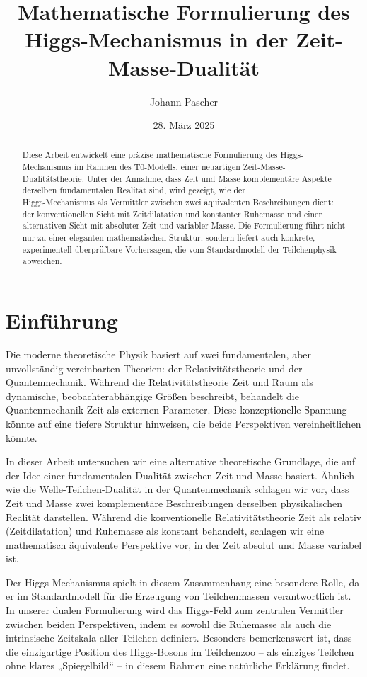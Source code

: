 \documentclass[a4paper,12pt]{article}
\title{Mathematische Formulierung des Higgs-Mechanismus in der Zeit-Masse-Dualität}
\author{Johann Pascher}
\date{28. März 2025}
\begin{document}
	
	\maketitle
	
	\begin{abstract}
		Diese Arbeit entwickelt eine präzise mathematische Formulierung des Higgs-Mechanismus im Rahmen des T0-Modells, einer neuartigen Zeit-Masse-Dualitätstheorie. Unter der Annahme, dass Zeit und Masse komplementäre Aspekte derselben fundamentalen Realität sind, wird gezeigt, wie der \\Higgs-Mechanismus als Vermittler zwischen zwei äquivalenten Beschreibungen dient: der konventionellen Sicht mit Zeitdilatation und konstanter Ruhemasse und einer alternativen Sicht mit absoluter Zeit und variabler Masse. Die Formulierung führt nicht nur zu einer eleganten mathematischen Struktur, sondern liefert auch konkrete, experimentell überprüfbare Vorhersagen, die vom Standardmodell der Teilchenphysik abweichen.
	\end{abstract}
	
	\tableofcontents
	\newpage
	
	\section{Einführung}
	Die moderne theoretische Physik basiert auf zwei fundamentalen, aber unvollständig vereinbarten Theorien: der Relativitätstheorie und der Quantenmechanik. Während die Relativitätstheorie Zeit und Raum als dynamische, beobachterabhängige Größen beschreibt, behandelt die Quantenmechanik Zeit als externen Parameter. Diese konzeptionelle Spannung könnte auf eine tiefere Struktur hinweisen, die beide Perspektiven vereinheitlichen könnte.
	
	In dieser Arbeit untersuchen wir eine alternative theoretische Grundlage, die auf der Idee einer fundamentalen Dualität zwischen Zeit und Masse basiert. Ähnlich wie die Welle-Teilchen-Dualität in der Quantenmechanik schlagen wir vor, dass Zeit und Masse zwei komplementäre Beschreibungen derselben physikalischen Realität darstellen. Während die konventionelle Relativitätstheorie Zeit als relativ (Zeitdilatation) und Ruhemasse als konstant behandelt, schlagen wir eine mathematisch äquivalente Perspektive vor, in der Zeit absolut und Masse variabel ist.
	
	Der Higgs-Mechanismus spielt in diesem Zusammenhang eine besondere Rolle, da er im Standardmodell für die Erzeugung von Teilchenmassen verantwortlich ist. In unserer dualen Formulierung wird das Higgs-Feld zum zentralen Vermittler zwischen beiden Perspektiven, indem es sowohl die Ruhemasse als auch die intrinsische Zeitskala aller Teilchen definiert. Besonders bemerkenswert ist, dass die einzigartige Position des Higgs-Bosons im Teilchenzoo – als einziges Teilchen ohne klares „Spiegelbild“ – in diesem Rahmen eine natürliche Erklärung findet.
	
\end{document}
